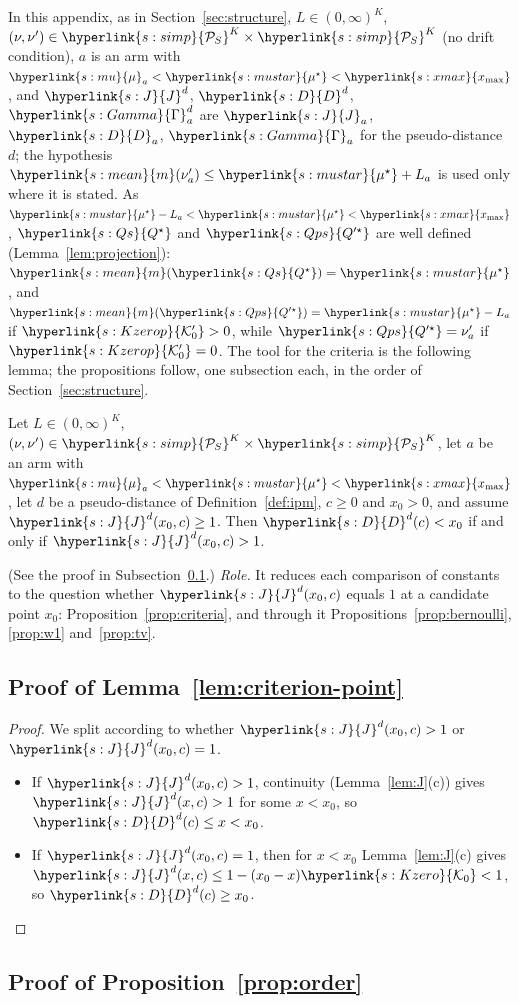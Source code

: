 \documentclass[11pt]{article}
\newcommand{\sy}[2]{{\hyperlink{#1}{#2}}}
\newcommand{\xmax}{\sy{s:xmax}{x_{\max}}}
\newcommand{\Simp}{\sy{s:simp}{\mathcal{P}_{S}}}
\newcommand{\mean}{\sy{s:mean}{m}}
\newcommand{\mk}{\sy{s:mu}{\mu}}
\newcommand{\mus}{\sy{s:mustar}{\mu^{\star}}}
\newcommand{\Pairs}{\sy{s:Gamma}{\Gamma}}
\newcommand{\Jf}{\sy{s:J}{J}}
\newcommand{\Dc}{\sy{s:D}{D}}
\newcommand{\Ko}{\sy{s:Kzero}{\mathcal{K}_{0}}}
\newcommand{\Kop}{\sy{s:Kzerop}{\mathcal{K}'_{0}}}
\newcommand{\Qs}{\sy{s:Qs}{Q^{\star}}}
\newcommand{\Qps}{\sy{s:Qps}{Q'^{\star}}}
\begin{document}
In this appendix, as in Section~\ref{sec:structure}, $L\in(0,\infty)^K$,
$(\nu,\nu')\in\Simp^K\times\Simp^K$ (no drift condition), $a$ is an arm with $\mk_a<\mus<\xmax$,
and $\Jf^d$, $\Dc^d$, $\Pairs^d_a$ are $\Jf_a$, $\Dc_a$, $\Pairs_a$ for the pseudo-distance $d$; the
hypothesis $\mean(\nu'_a)\le\mus+L_a$ is used only where it is stated. As
$\mus-L_a<\mus<\xmax$, $\Qs$ and $\Qps$ are well defined (Lemma~\ref{lem:projection}):
$\mean(\Qs)=\mus$, and $\mean(\Qps)=\mus-L_a$ if $\Kop>0$, while $\Qps=\nu'_a$ if $\Kop=0$.
The tool for the criteria is the following lemma; the propositions follow, one subsection each, in
the order of Section~\ref{sec:structure}.

\begin{lemma}\label{lem:criterion-point}
Let $L\in(0,\infty)^K$, $(\nu,\nu')\in\Simp^K\times\Simp^K$, let $a$ be an arm with
$\mk_a<\mus<\xmax$, let $d$ be a pseudo-distance of Definition~\ref{def:ipm}, $c\ge0$ and
$x_0>0$, and assume $\Jf^d(x_0,c)\ge1$. Then $\Dc^d(c)<x_0$ if and only if $\Jf^d(x_0,c)>1$.
\end{lemma}

(See the proof in Subsection~\ref{sec:proof-lem-criterion-point}.) \emph{Role.} It reduces each
comparison of constants to the question whether $\Jf^d(x_0,c)$ equals $1$ at a candidate point $x_0$:
Proposition~\ref{prop:criteria}, and through it Propositions~\ref{prop:bernoulli}, \ref{prop:w1}
and~\ref{prop:tv}.

\subsection{Proof of Lemma~\ref{lem:criterion-point}}\label{sec:proof-lem-criterion-point}

\begin{proof}
We split according to whether $\Jf^d(x_0,c)>1$ or $\Jf^d(x_0,c)=1$.
\begin{itemize}
\item If $\Jf^d(x_0,c)>1$, continuity (Lemma~\ref{lem:J}(c)) gives $\Jf^d(x,c)>1$ for some $x<x_0$, so
  $\Dc^d(c)\le x<x_0$.
\item If $\Jf^d(x_0,c)=1$, then for $x<x_0$ Lemma~\ref{lem:J}(c) gives
  $\Jf^d(x,c)\le1-(x_0-x)\Ko<1$, so $\Dc^d(c)\ge x_0$.\qedhere
\end{itemize}
\end{proof}

\subsection{Proof of Proposition~\ref{prop:order}}\label{sec:proof-prop-order}
\end{document}
